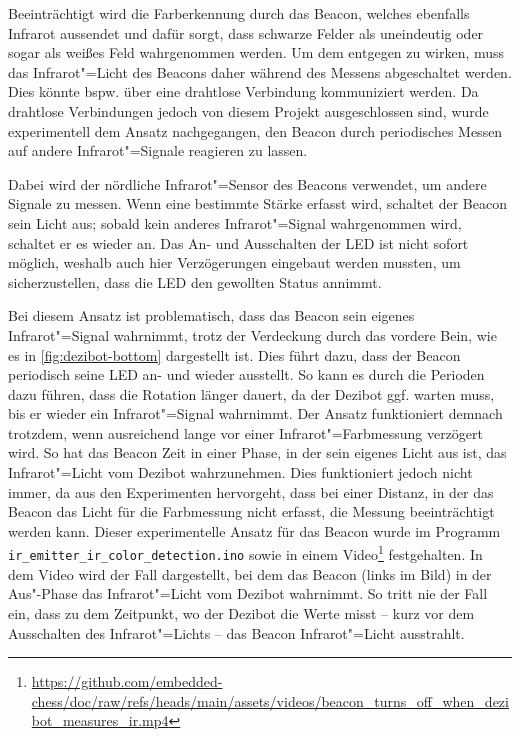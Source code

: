 Beeinträchtigt wird die Farberkennung durch das Beacon, welches ebenfalls Infrarot aussendet und dafür sorgt, dass schwarze Felder als uneindeutig oder sogar als weißes Feld wahrgenommen werden. Um dem entgegen zu wirken, muss das Infrarot"=Licht des Beacons daher während des Messens abgeschaltet werden. Dies könnte bspw. über eine drahtlose Verbindung kommuniziert werden. Da drahtlose Verbindungen jedoch von diesem Projekt ausgeschlossen sind, wurde experimentell dem Ansatz nachgegangen, den Beacon durch periodisches Messen auf andere Infrarot"=Signale reagieren zu lassen.

Dabei wird der nördliche Infrarot"=Sensor des Beacons verwendet, um andere Signale zu messen. Wenn eine bestimmte Stärke erfasst wird, schaltet der Beacon sein Licht aus; sobald kein anderes Infrarot"=Signal wahrgenommen wird, schaltet er es wieder an. Das An- und Ausschalten der LED ist nicht sofort möglich, weshalb auch hier Verzögerungen eingebaut werden mussten, um sicherzustellen, dass die LED den gewollten Status annimmt.

Bei diesem Ansatz ist problematisch, dass das Beacon sein eigenes Infrarot"=Signal wahrnimmt, trotz der Verdeckung durch das vordere Bein, wie es in \autoref{fig:dezibot-bottom} dargestellt ist. Dies führt dazu, dass der Beacon periodisch seine LED an- und wieder ausstellt. So kann es durch die Perioden dazu führen, dass die Rotation länger dauert, da der Dezibot ggf. warten muss, bis er wieder ein Infrarot"=Signal wahrnimmt. Der Ansatz funktioniert demnach trotzdem, wenn ausreichend lange vor einer Infrarot"=Farbmessung verzögert wird. So hat das Beacon Zeit in einer Phase, in der sein eigenes Licht aus ist, das Infrarot"=Licht vom Dezibot wahrzunehmen. Dies funktioniert jedoch nicht immer, da aus den Experimenten hervorgeht, dass bei einer Distanz, in der das Beacon das Licht für die Farbmessung nicht erfasst, die Messung beeinträchtigt werden kann. Dieser experimentelle Ansatz für das Beacon wurde im Programm \texttt{ir\_emitter\_ir\_color\_detection.ino} sowie in einem Video\footnote{\url{https://github.com/embedded-chess/doc/raw/refs/heads/main/assets/videos/beacon_turns_off_when_dezibot_measures_ir.mp4}} festgehalten. In dem Video wird der Fall dargestellt, bei dem das Beacon (links im Bild) in der Aus"-Phase das Infrarot"=Licht vom Dezibot wahrnimmt. So tritt nie der Fall ein, dass zu dem Zeitpunkt, wo der Dezibot die Werte misst -- kurz vor dem Ausschalten des Infrarot"=Lichts -- das Beacon Infrarot"=Licht ausstrahlt.


